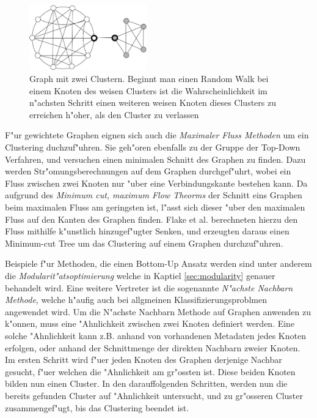 \documentclass[journal]{vgtc}
\begin{document}
    \begin{figure}[h]
    \centering
    \includegraphics[width=2in]{images/random_walk}
    \caption{\label{fig:random_walk} Graph mit zwei Clustern. Beginnt man einen Random Walk bei einem Knoten des weisen Clusters
	      ist die Wahrscheinlichkeit im n"achsten Schritt einen weiteren weisen Knoten dieses Clusters zu erreichen h"oher,
	      als den Cluster zu verlassen \cite{Schaeffer}}
    \end{figure}
    
  F"ur gewichtete Graphen eignen sich auch die \emph{Maximaler Fluss Methoden} um ein Clustering duchzuf"uhren. Sie
  geh"oren ebenfalls zu der Gruppe der Top-Down Verfahren, und versuchen einen minimalen Schnitt \cite{Schaeffer} des Graphen zu finden. 
  Dazu werden Str"omungsberechnungen auf dem Graphen durchgef"uhrt, wobei ein Fluss zwischen zwei Knoten nur "uber eine Verbindungskante bestehen kann.
  Da aufgrund des \emph{Minimum cut, maximum Flow Theorms} der Schnitt eins Graphen beim maximalen Fluss am geringsten ist, l"asst sich dieser "uber
  den maximalen Fluss auf den Kanten des Graphen finden. Flake et al.\cite{flake} berechneten hierzu den Fluss mithilfe k"unstlich hinzugef"ugter
  Senken, und erzeugten daraus einen Minimum-cut Tree\cite{minimum_cut_tree} um das Clustering auf einem Graphen durchzuf"uhren.
  
  Beispiele f"ur Methoden, die einen Bottom-Up Ansatz werden sind unter anderem die \emph{Modularit"atsoptimierung} welche
  in Kaptiel \ref{sec:modularity} genauer behandelt wird. Eine weitere Vertreter ist die sogenannte \emph{N"achste Nachbarn Methode}\cite{Schaeffer}, welche
  h"aufig auch bei allgmeinen Klassifizierungsproblmen angewendet wird. Um die N"achste Nachbarn Methode auf Graphen anwenden
  zu k"onnen, muss eine "Ahnlichkeit zwischen zwei Knoten definiert werden. Eine solche "Ahnlichkeit
  kann z.B. anhand von vorhandenen Metadaten jedes Knoten erfolgen, oder anhand der Schnittmenge der direkten Nachbarn zweier
  Knoten. Im ersten Schritt wird f"uer jeden Knoten des Graphen derjenige Nachbar gesucht, f"uer welchen die "Ahnlichkeit am gr"ossten ist.
  Diese beiden Knoten bilden nun einen Cluster. In den darauffolgenden Schritten, werden nun die bereits gefunden Cluster auf "Ahnlichkeit
  untersucht, und zu gr"osseren Cluster zusammengef"ugt, bis das Clustering beendet ist.
  
\end{document}

